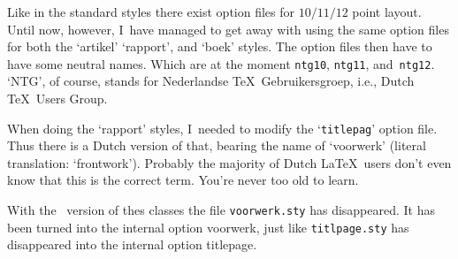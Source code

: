 \documentclass[10pt]{artikel1} %
\newcommand\Lopt[1]{\textsf{#1}}
\newcommand\file[1]{\texttt{#1}}
\begin{document}
Like in the standard styles there exist option files for $10/11/12$
point layout. Until now, however, I~have managed to get away with
using the same option files for both the `artikel' `rapport', and
`boek' styles.  The option files then have to have some neutral names.
Which are at the moment \file{ntg10}, \file{ntg11},
and~\file{ntg12}. `NTG', of course, stands for Nederlandse \TeX\ 
Gebruikersgroep, i.e., Dutch \TeX\ Users Group.

When doing the `rapport' styles, I~needed to modify the `\file{titlepag}'
option file. Thus there is a Dutch version of that, bearing the name
of `voorwerk' (literal translation: `frontwork').  Probably the
majority of Dutch \LaTeX\ users don't even know that this is the
correct term.  You're never too old to learn.

With the \LaTeXe\ version of thes classes the file \file{voorwerk.sty}
has disappeared. It has been turned into the internal option
\Lopt{voorwerk}, just like \file{titlpage.sty} has disappeared into
the internal option \Lopt{titlepage}.
\end{document}

